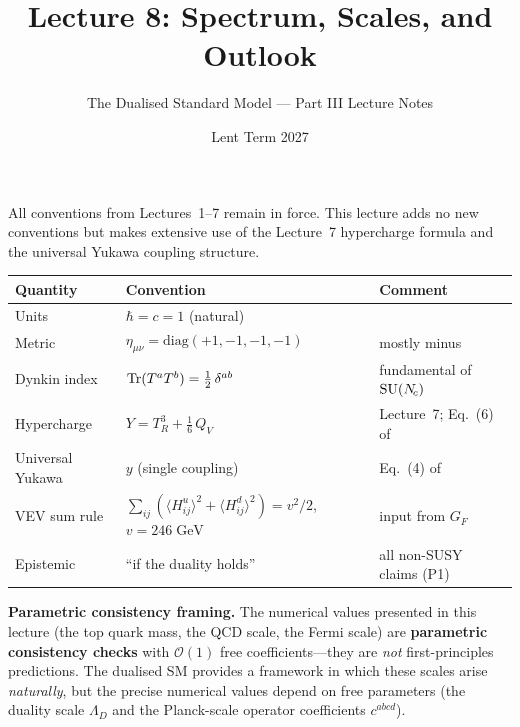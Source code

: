 \documentclass[11pt,a4paper]{article}
\title{\textbf{Lecture 8: Spectrum, Scales, and Outlook}}
\author{The Dualised Standard Model --- Part III Lecture Notes}
\date{Lent Term 2027}
\begin{document}
\maketitle

\tableofcontents
\newpage


\begin{conventionbox}[title={Conventions for Lecture 8}]
All conventions from Lectures~1--7 remain in force.  This lecture adds
no new conventions but makes extensive use of the Lecture~7 hypercharge
formula and the universal Yukawa coupling structure.

\renewcommand{\arraystretch}{1.3}
\begin{tabular}{@{}l l l@{}}
\toprule
\textbf{Quantity} & \textbf{Convention} & \textbf{Comment} \\
\midrule
Units & $\hbar = c = 1$ (natural) & \\
Metric & $\eta_{\mu\nu} = \mathrm{diag}(+1,-1,-1,-1)$ & mostly minus \\
Dynkin index & $\mathrm{Tr}(T^a T^b) = \tfrac{1}{2}\, \delta^{ab}$ & fundamental of $\mathrm{SU}(N_{\!c})$ \\
Hypercharge & $Y = T_R^3 + \tfrac{1}{6}\,Q_V$ & Lecture~7; Eq.~(6) of \cite{CacciapagliaSannino2024} \\
Universal Yukawa & $y$ (single coupling) & Eq.~(4) of \cite{CacciapagliaSannino2024} \\
VEV sum rule & $\sum_{ij}(\langle H_{ij}^u\rangle^2 + \langle H_{ij}^d\rangle^2) = v^2/2$, $v = 246\;\text{GeV}$ & input from $G_F$ \\
Epistemic & ``if the duality holds'' & all non-SUSY claims (P1) \\
\bottomrule
\end{tabular}

\medskip

\textbf{Parametric consistency framing.}  The numerical values
presented in this lecture (the top quark mass, the QCD scale, the Fermi
scale) are \textbf{parametric consistency checks} with $\mathcal{O}(1)$
free coefficients---they are \emph{not} first-principles predictions.
The dualised SM provides a framework in which these scales arise
\emph{naturally}, but the precise numerical values depend on free
parameters (the duality scale $\Lambda_D$ and the Planck-scale operator
coefficients $c^{abcd}$).
\end{conventionbox}
\end{document}
